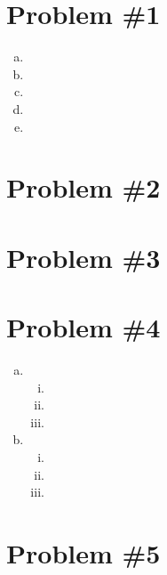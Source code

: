 \documentclass[11pt]{article}
\numberwithin{equation}{section}
\begin{document}


\section{Problem \#1}
\begin{enumerate}[(a)]
\item
\item
\item
\item
\item
\end{enumerate}

\section{Problem \#2}

\section{Problem \#3}

\section{Problem \#4}
\begin{enumerate}[(a)]

\item
\begin{enumerate}[(i)]
\item
\item
\item
\end{enumerate}

\item
\begin{enumerate}[(i)]
\item
\item
\item
\end{enumerate}
\end{enumerate}

\section{Problem \#5}
\end{document}
